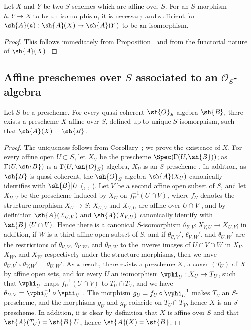 \begin{corollary}[1.2.8]
\label{II.1.2.8}
Let $X$ and $Y$ be two $S$-schemes which are affine over $S$.
For an $S$-morphism $h:Y\to X$ to be an isomorphism, it is necessary and sufficient for $\sh{A}(h):\sh{A}(X)\to\sh{A}(Y)$ to be an isomorphism.
\end{corollary}

\begin{proof}
This follows immediately from Proposition~ and from the functorial nature of $\sh{A}(X)$.
\end{proof}

\subsection{Affine preschemes over $S$ associated to an $\mathcal{O}_S$-algebra}
\label{subsection:II.1.3}

\begin{proposition}[1.3.1]
\label{II.1.3.1}
Let $S$ be a prescheme.
For every quasi-coherent $\sh{O}_S$-algebra $\sh{B}$, there exists a prescheme $X$ affine over $S$, defined up to unique $S$-isomorphism, such that $\sh{A}(X)=\sh{B}$.
\end{proposition}

\begin{proof}
The uniqueness follows from Corollary~; we prove the existence of $X$.
For every affine open $U\subset S$, let $X_U$ be the prescheme $\Spec(\Gamma(U,\sh{B}))$; as $\Gamma(U,\sh{B})$ is a $\Gamma(U,\sh{O}_S)$-algebra, $X_U$ is an $S$-prescheme .
In addition, as $\sh{B}$ is quasi-coherent, the $\sh{O}_S$-algebra $\sh{A}(X_U)$ canonically identifies with $\sh{B}|U$ (, , ).
Let $V$ be a second affine open subset of $S$, and let $X_{U,V}$ be the prescheme induced by $X_U$ on $f_U^{-1}(U\cap V)$, where $f_U$ denotes the structure morphism $X_U\to S$; $X_{U,V}$ and $X_{V,U}$ are affine over $U\cap V$ , and by definition $\sh{A}(X_{U,V})$ and $\sh{A}(X_{V,U})$ canonically identify with $\sh{B}|(U\cap V)$.
Hence there is  a canonical $S$-isomorphism $\theta_{U,V}:X_{V,U}\to X_{U,V}$; in addition, if $W$ is a third affine open subset of $S$, and if $\theta_{U,V}'$, $\theta_{V,W}'$, and $\theta_{U,W}'$ are the restrictions of $\theta_{U,V}$, $\theta_{V,W}$, and $\theta_{U,W}$ to the inverse images of $U\cap V\cap W$ in $X_V$, $X_W$, and $X_W$ respectively under the structure morphisms, then we have $\theta_{U,V}'\circ\theta_{V,W}'=\theta_{U,W}'$.
As a result, there exists a prescheme $X$, a cover $(T_U)$ of $X$ by affine open sets, and for every $U$ an isomorphism $\vphi_U:X_U\to T_U$, such that $\vphi_U$ maps $f_U^{-1}(U\cap V)$ to $T_U\cap T_V$, and we have $\theta_{U,V}=\vphi_U^{-1}\circ\vphi_V$ .
The morphism $g_U=f_U\circ\vphi_U^{-1}$ makes $T_U$ an $S$-prescheme, and the morphisms $g_U$ and $g_V$ coincide on $T_U\cap T_V$, hence $X$ is an $S$-prescheme.
In addition, it is clear by definition that $X$ is affine over $S$ and that $\sh{A}(T_U)=\sh{B}|U$, hence $\sh{A}(X)=\sh{B}$.
\end{proof}

